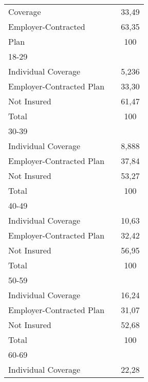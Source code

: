 {\begin{tabular}{l*{2}{c}}
Coverage    &                     &       33,49\sym{***}\\
Employer-Contracted&                     &       63,35\sym{***}\\
Plan        &                     &         100         \\
\hline
18-29       &                     &                     \\
Individual Coverage&                     &       5,236\sym{***}\\
Employer-Contracted Plan&                     &       33,30\sym{***}\\
Not Insured &                     &       61,47\sym{***}\\
Total       &                     &         100         \\
\hline
30-39       &                     &                     \\
Individual Coverage&                     &       8,888\sym{***}\\
Employer-Contracted Plan&                     &       37,84\sym{***}\\
Not Insured &                     &       53,27\sym{***}\\
Total       &                     &         100         \\
\hline
40-49       &                     &                     \\
Individual Coverage&                     &       10,63\sym{***}\\
Employer-Contracted Plan&                     &       32,42\sym{***}\\
Not Insured &                     &       56,95\sym{***}\\
Total       &                     &         100         \\
\hline
50-59       &                     &                     \\
Individual Coverage&                     &       16,24\sym{***}\\
Employer-Contracted Plan&                     &       31,07\sym{***}\\
Not Insured &                     &       52,68\sym{***}\\
Total       &                     &         100         \\
\hline
60-69       &                     &                     \\
Individual Coverage&                     &       22,28\sym{***}\\

\end{tabular}}
